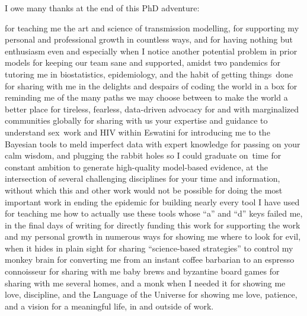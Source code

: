 I owe many thanks at the end of this PhD adventure:
\begin{acknowlist}
    {for teaching me the art and science of transmission modelling,
     for supporting my personal and professional growth in countless ways, and
     for having nothing but enthusiasm even and especially when I notice another potential problem in prior models}
    {for keeping our team sane and supported, amidst two pandemics}
    {for tutoring me in biostatistics, epidemiology, and the habit of getting things~done}
    {for sharing with me in the delights and despairs of coding the world in a box}
    {for reminding me of the many paths we may choose between to make the world a better place}
\bigskip
{}
    {for tireless, fearless, data-driven advocacy for and with marginalized communities globally}
    {for sharing with us your expertise and guidance to understand sex~work and HIV within Eswatini}
    {for introducing me to the Bayesian tools to meld imperfect data with expert knowledge}
    {for passing on your calm wisdom, and plugging the rabbit holes so I could graduate on~time}
\bigskip
{}
    {for constant ambition to generate high-quality model-based evidence, at the intersection of several challenging disciplines}
    {for your time and information, without which this and other work would not be possible}
    {for doing the most important work in ending the epidemic}
\bigskip
{}
    {for building nearly every tool I have used}
    {for teaching me how to actually use these tools}
    {whose ``a'' and ``d'' keys failed me, in the final days of writing}
\bigskip
{}
    {for directly funding this work}
    {for supporting the work and my personal growth in numerous ways}
\bigskip
{}
    {for showing me where to look for evil, when it hides in plain sight}
    {for sharing ``science-based strategies'' to control my monkey brain}
    {for converting me from an instant coffee barbarian to an espresso connoisseur}
    {for sharing with me baby brews and byzantine board games}
    {for sharing with me several homes, and a monk when I needed it}
    {for showing me love, discipline, and the Language of the Universe}
    {for showing me love, patience, and a vision for a meaningful life, in and outside of work.}
\end{acknowlist}
